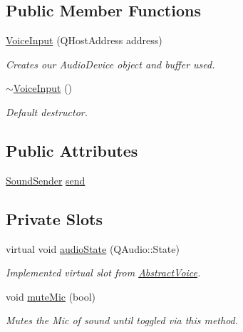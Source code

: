 \subsection*{\-Public \-Member \-Functions}
\begin{DoxyCompactItemize}
\item 
\hyperlink{class_voice_input_a57880cf450adb3749b952de271b8261f}{\-Voice\-Input} (\-Q\-Host\-Address address)
\begin{DoxyCompactList}\small\item\em \-Creates our \-Audio\-Device object and buffer used. \end{DoxyCompactList}\item 
\hyperlink{class_voice_input_a9ebb274fbb6075af8feb26f2cd3b6e93}{$\sim$\-Voice\-Input} ()
\begin{DoxyCompactList}\small\item\em \-Default destructor. \end{DoxyCompactList}\end{DoxyCompactItemize}
\subsection*{\-Public \-Attributes}
\begin{DoxyCompactItemize}
\item 
\hyperlink{class_sound_sender}{\-Sound\-Sender} \hyperlink{class_voice_input_a40ab6705a21bcbaae15e9a673f6eee53}{send}
\end{DoxyCompactItemize}
\subsection*{\-Private \-Slots}
\begin{DoxyCompactItemize}
\item 
virtual void \hyperlink{class_voice_input_a2481e823c393974288383a7f470054ad}{audio\-State} (\-Q\-Audio\-::\-State)
\begin{DoxyCompactList}\small\item\em \-Implemented virtual slot from \hyperlink{class_abstract_voice}{\-Abstract\-Voice}. \end{DoxyCompactList}\item 
void \hyperlink{class_voice_input_a6f48cb2d0fb8239c284545fda2c099bb}{mute\-Mic} (bool)
\begin{DoxyCompactList}\small\item\em \-Mutes the \-Mic of sound until toggled via this method. \end{DoxyCompactList}\end{DoxyCompactItemize}

